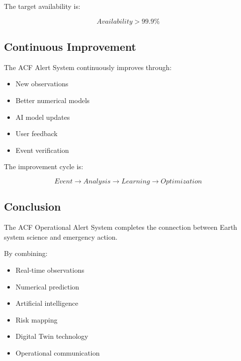 The target availability is:

\[
Availability > 99.9\%
\]



\subsection{Continuous Improvement}

The ACF Alert System continuously improves through:

\begin{itemize}

\item New observations

\item Better numerical models

\item AI model updates

\item User feedback

\item Event verification

\end{itemize}


The improvement cycle is:

\[
Event
\rightarrow
Analysis
\rightarrow
Learning
\rightarrow
Optimization
\]



\subsection{Conclusion}

The ACF Operational Alert System completes the connection between
Earth system science and emergency action.

By combining:

\begin{itemize}

\item Real-time observations

\item Numerical prediction

\item Artificial intelligence

\item Risk mapping

\item Digital Twin technology

\item Operational communication

\end{itemize}


